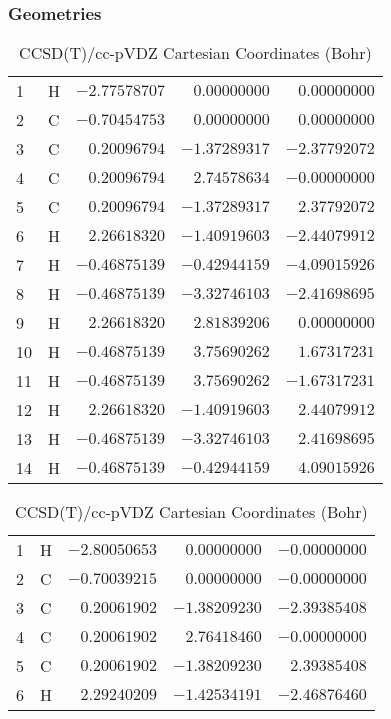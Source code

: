 \documentclass[10pt,oneside]{article}
\begin{document}
\begin{table}[h!]
\subsubsection*{Geometries}
\begin{multicols}{2}
\centering
\caption{CCSD(T)/cc-pVTZ Cartesian Coordinates (Bohr)}
\begin{tabular}{llrrr}
\toprule
1  & H  & $-2.77578707$ & $ 0.00000000$ & $ 0.00000000$ \\
2  & C  & $-0.70454753$ & $ 0.00000000$ & $ 0.00000000$ \\
3  & C  & $ 0.20096794$ & $-1.37289317$ & $-2.37792072$ \\
4  & C  & $ 0.20096794$ & $ 2.74578634$ & $-0.00000000$ \\
5  & C  & $ 0.20096794$ & $-1.37289317$ & $ 2.37792072$ \\
6  & H  & $ 2.26618320$ & $-1.40919603$ & $-2.44079912$ \\
7  & H  & $-0.46875139$ & $-0.42944159$ & $-4.09015926$ \\
8  & H  & $-0.46875139$ & $-3.32746103$ & $-2.41698695$ \\
9  & H  & $ 2.26618320$ & $ 2.81839206$ & $ 0.00000000$ \\
10 & H  & $-0.46875139$ & $ 3.75690262$ & $ 1.67317231$ \\
11 & H  & $-0.46875139$ & $ 3.75690262$ & $-1.67317231$ \\
12 & H  & $ 2.26618320$ & $-1.40919603$ & $ 2.44079912$ \\
13 & H  & $-0.46875139$ & $-3.32746103$ & $ 2.41698695$ \\
14 & H  & $-0.46875139$ & $-0.42944159$ & $ 4.09015926$ \\
\bottomrule
\end{tabular}
\caption{CCSD(T)/cc-pVDZ Cartesian Coordinates (Bohr)}
\begin{tabular}{llrrr}
\toprule
1  & H  & $-2.80050653$ & $ 0.00000000$ & $-0.00000000$ \\
2  & C  & $-0.70039215$ & $ 0.00000000$ & $-0.00000000$ \\
3  & C  & $ 0.20061902$ & $-1.38209230$ & $-2.39385408$ \\
4  & C  & $ 0.20061902$ & $ 2.76418460$ & $-0.00000000$ \\
5  & C  & $ 0.20061902$ & $-1.38209230$ & $ 2.39385408$ \\
6  & H  & $ 2.29240209$ & $-1.42534191$ & $-2.46876460$ \\

\end{tabular}
\end{multicols}
\end{table}
\end{document}
